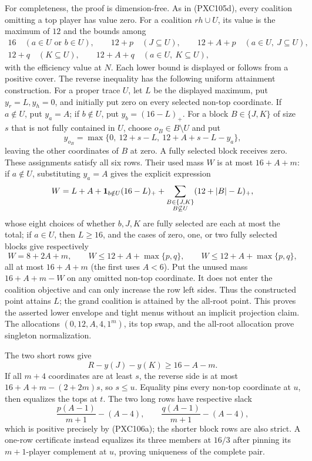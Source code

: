 \documentclass[11pt]{article}
\begin{document}
For completeness, the proof is dimension-free.  As in (PXC105d), every
coalition omitting a top player has value zero.  For a coalition
\(rh\cup U\), its value is the maximum of \(12\) and the bounds among
\[
\begin{gathered}
 16\quad(a\in U\text{ or }b\in U),\qquad
 12+p\quad(J\subseteq U),\qquad
 12+A+p\quad(a\in U,\ J\subseteq U),\\
 12+q\quad(K\subseteq U),\qquad
 12+A+q\quad(a\in U,\ K\subseteq U),
\end{gathered}
\]
with the efficiency value at \(N\).  Each lower bound is displayed or follows
from a positive cover.  The reverse inequality has the following uniform
attainment construction.  For a proper trace \(U\), let \(L\) be the displayed
maximum, put \(y_r=L,y_h=0\), and initially put zero on every selected
non-top coordinate.  If \(a\notin U\), put \(y_a=A\); if \(b\notin U\), put
\(y_b=(16-L)_+\).  For a block \(B\in\{J,K\}\) of size \(s\) that is not
fully contained in \(U\), choose \(o_B\in B\setminus U\) and put
\[
 y_{o_B}=\max\{0,\ 12+s-L,\ 12+A+s-L-y_a\},
\]
leaving the other coordinates of \(B\) at zero.  A fully selected block
receives zero.  These assignments satisfy all six rows.  Their used mass
\(W\) is at most \(16+A+m\): if \(a\notin U\), substituting \(y_a=A\)
gives the explicit expression
\[
 W=L+A+{\bf1}_{b\notin U}(16-L)_+
   +\sum_{\substack{B\in\{J,K\}\\B\not\subseteq U}}
      (12+|B|-L)_+,
\]
whose eight choices of whether \(b,J,K\) are fully selected are each at most
the total;
if \(a\in U\), then \(L\ge16\), and the cases of zero, one, or two fully
selected blocks give respectively
\[
 W=8+2A+m,\qquad
 W\le12+A+\max\{p,q\},\qquad
 W\le12+A+\max\{p,q\},
\]
all at most \(16+A+m\) (the first uses \(A<6\)).  Put the unused mass
\(16+A+m-W\) on any omitted non-top coordinate.  It does not enter the
coalition objective and can only increase the row left sides.  Thus the
constructed point attains \(L\); the grand coalition is attained by the
all-root point.  This proves the asserted lower envelope and tight menus
without an implicit projection claim.  The allocations
\((0,12,A,4,1^m)\), its top swap, and the all-root allocation prove singleton
normalization.

The two short rows give
\[
 R-y(J)-y(K)\ge16-A-m.
\]
If all \(m+4\) coordinates are at least \(s\), the reverse side is at most
\(16+A+m-(2+2m)s\), so \(s\le u\).  Equality pins every non-top
coordinate at \(u\), then equalizes the tops at \(t\).  The two long rows
have respective slack
\[
 \frac{p(A-1)}{m+1}-(A-4),\qquad
 \frac{q(A-1)}{m+1}-(A-4),
\]
which is positive precisely by (PXC106a); the shorter block rows are also
strict.  A one-row certificate instead equalizes its three members at
\(16/3\) after pinning its \(m+1\)-player complement at \(u\), proving
uniqueness of the complete pair.
\end{document}
